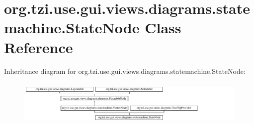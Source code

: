 \hypertarget{classorg_1_1tzi_1_1use_1_1gui_1_1views_1_1diagrams_1_1statemachine_1_1_state_node}{\section{org.\-tzi.\-use.\-gui.\-views.\-diagrams.\-statemachine.\-State\-Node Class Reference}
\label{classorg_1_1tzi_1_1use_1_1gui_1_1views_1_1diagrams_1_1statemachine_1_1_state_node}
}
Inheritance diagram for org.\-tzi.\-use.\-gui.\-views.\-diagrams.\-statemachine.\-State\-Node\-:\begin{figure}[H]
\begin{center}
\leavevmode
\includegraphics[height=2.202557cm]{classorg_1_1tzi_1_1use_1_1gui_1_1views_1_1diagrams_1_1statemachine_1_1_state_node}
\end{center}
\end{figure}

